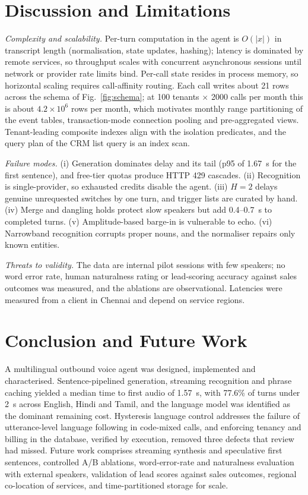\documentclass[conference]{IEEEtran}
\begin{document}
\section{Discussion and Limitations}\label{sec:discussion}
\textit{Complexity and scalability.} Per-turn computation in the agent is $O(|x|)$ in transcript length (normalisation, state updates, hashing); latency is dominated by remote services, so throughput scales with concurrent asynchronous sessions until network or provider rate limits bind. Per-call state resides in process memory, so horizontal scaling requires call-affinity routing. Each call writes about 21 rows across the schema of Fig.~\ref{fig:schema}; at 100 tenants $\times$ 2000 calls per month this is about $4.2\times10^{6}$ rows per month, which motivates monthly range partitioning of the event tables, transaction-mode connection pooling and pre-aggregated views. Tenant-leading composite indexes align with the isolation predicates, and the query plan of the CRM list query is an index scan.

\textit{Failure modes.} (i) Generation dominates delay and its tail (p95 of 1.67~s for the first sentence), and free-tier quotas produce HTTP 429 cascades. (ii) Recognition is single-provider, so exhausted credits disable the agent. (iii) $H=2$ delays genuine unrequested switches by one turn, and trigger lists are curated by hand. (iv) Merge and dangling holds protect slow speakers but add 0.4--0.7~s to completed turns. (v) Amplitude-based barge-in is vulnerable to echo. (vi) Narrowband recognition corrupts proper nouns, and the normaliser repairs only known entities.

\textit{Threats to validity.} The data are internal pilot sessions with few speakers; no word error rate, human naturalness rating or lead-scoring accuracy against sales outcomes was measured, and the ablations are observational. Latencies were measured from a client in Chennai and depend on service regions.

\section{Conclusion and Future Work}\label{sec:conclusion}
A multilingual outbound voice agent was designed, implemented and characterised. Sentence-pipelined generation, streaming recognition and phrase caching yielded a median time to first audio of 1.57~s, with 77.6\% of turns under 2~s across English, Hindi and Tamil, and the language model was identified as the dominant remaining cost. Hysteresis language control addresses the failure of utterance-level language following in code-mixed calls, and enforcing tenancy and billing in the database, verified by execution, removed three defects that review had missed. Future work comprises streaming synthesis and speculative first sentences, controlled A/B ablations, word-error-rate and naturalness evaluation with external speakers, validation of lead scores against sales outcomes, regional co-location of services, and time-partitioned storage for scale.



\end{document}
